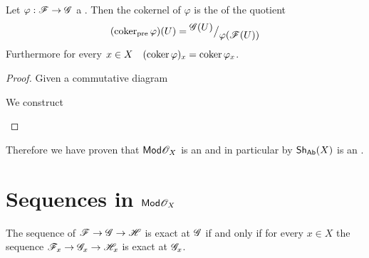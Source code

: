 \documentclass[../main.tex]{subfiles}
\begin{document}
\begin{theorem}
  Let \(\varphi: \mathscr{F} \to \mathscr{G}\) a .
  Then the cokernel of \(\varphi\) is the  of the quotient 
  \begin{equation*}
    (\operatorname{coker}_{\operatorname*{pre}} \varphi)(U) = {^{\textstyle \mathscr{G}(U)}\big/_{\textstyle \varphi(\mathscr{F}(U))}}
  \end{equation*}
  Furthermore for every \(x \in X \quad (\operatorname*{coker} \varphi)_{x} = \operatorname*{coker} \varphi_{x}\).
\end{theorem}
\begin{proof}
  Given a commutative diagram
  \begin{center}
  \end{center}
  We construct
  \begin{center}
  \end{center}
\end{proof}

Therefore we have proven that \(\mathsf{Mod}{\mathscr{O}_{X}}\) is an  and in particular by  \(\mathsf{Sh}_{\mathsf{Ab}}(X)\) is an .

\section{Sequences in \(\mathsf{Mod}{\mathscr{O}_{X}}\)}

\begin{theorem} 
  The sequence of  \(\mathscr{F} \to \mathscr{G} \to \mathscr{H}\) is exact at \(\mathscr{G}\) if and only if for every \(x \in X\) the sequence \(\mathscr{F}_{x} \to \mathscr{G}_{x} \to \mathscr{H}_{x}\) is exact at \(\mathscr{G}_{x}\).
\end{theorem}


\end{document}
